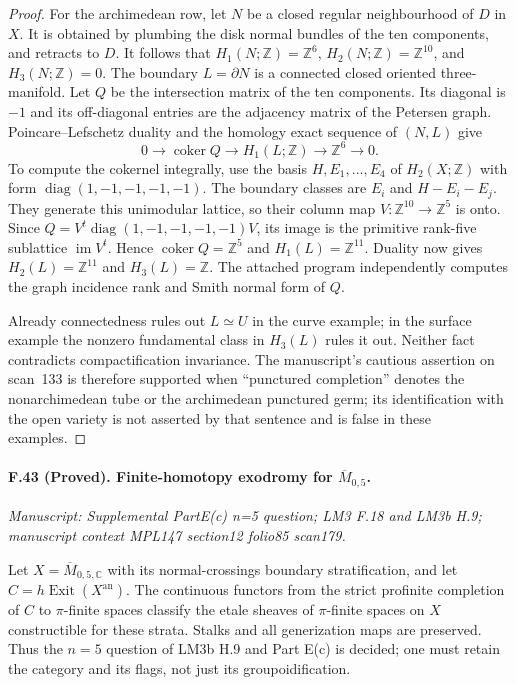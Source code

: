 \begin{proof}
For the archimedean row, let $N$ be a closed regular neighbourhood of
$D$ in $X$. It is obtained by plumbing the disk normal bundles of the
ten components, and retracts to $D$. It follows that
$H_1(N;\mathbb Z)=\mathbb Z^6$, $H_2(N;\mathbb Z)=\mathbb Z^{10}$,
and $H_3(N;\mathbb Z)=0$. The boundary $L=\partial N$ is a connected
closed oriented three-manifold. Let $Q$ be the intersection matrix of
the ten components. Its diagonal is $-1$ and its off-diagonal entries
are the adjacency matrix of the Petersen graph. Poincare--Lefschetz
duality and the homology exact sequence of $(N,L)$ give
\[
 0\longrightarrow\operatorname{coker}Q\longrightarrow H_1(L;\mathbb Z)
       \longrightarrow\mathbb Z^6\longrightarrow0.
\]
To compute the cokernel integrally, use the basis $H,E_1,\ldots,E_4$ of
$H_2(X;\mathbb Z)$ with form $\operatorname{diag}(1,-1,-1,-1,-1)$.
The boundary classes are $E_i$ and $H-E_i-E_j$. They generate this
unimodular lattice, so their column map $V:\mathbb Z^{10}\to\mathbb Z^5$
is onto. Since $Q=V^t\operatorname{diag}(1,-1,-1,-1,-1)V$, its image is
the primitive rank-five sublattice $\operatorname{im}V^t$. Hence
$\operatorname{coker}Q=\mathbb Z^5$ and $H_1(L)=\mathbb Z^{11}$.
Duality now gives $H_2(L)=\mathbb Z^{11}$ and $H_3(L)=\mathbb Z$.
The attached program independently computes the graph incidence rank
and Smith normal form of $Q$.

Already connectedness rules out $L\simeq U$ in the curve example; in
the surface example the nonzero fundamental class in $H_3(L)$ rules it
out. Neither fact contradicts compactification invariance. The
manuscript's cautious assertion on scan~133 is therefore supported
when ``punctured completion'' denotes the nonarchimedean tube or the
archimedean punctured germ; its identification with the open variety is
not asserted by that sentence and is false in these examples.
\end{proof}


\paragraph{F.43 (Proved). Finite-homotopy exodromy for $\overline M_{0,5}$.}
\textit{Manuscript: Supplemental PartE(c) n=5 question; LM3 F.18 and LM3b H.9; manuscript context MPL147 section12 folio85 scan179.}

Let $X=\overline M_{0,5,\mathbb C}$ with its normal-crossings boundary
stratification, and let $C=h\operatorname{Exit}(X^{\mathrm{an}})$.
The continuous functors from the strict profinite completion of $C$ to
$\pi$-finite spaces classify the etale sheaves of $\pi$-finite spaces on
$X$ constructible for these strata. Stalks and all generization maps are
preserved. Thus the $n=5$ question of LM3b H.9 and Part E(c) is decided;
one must retain the category and its flags, not just its groupoidification.

